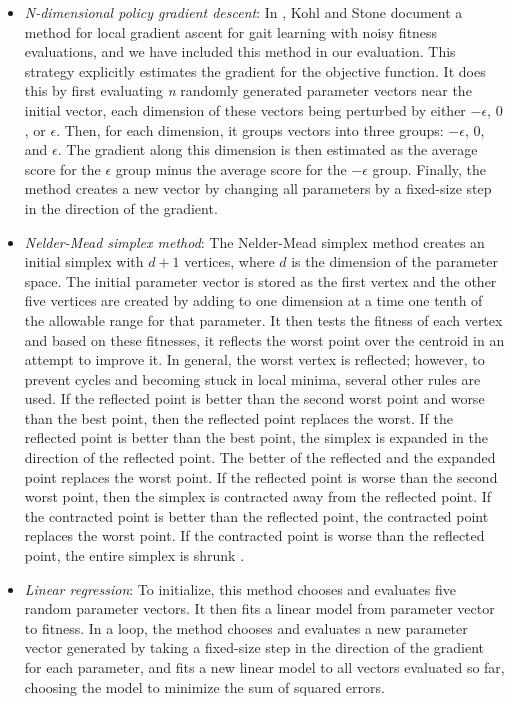\begin{itemize}
\item \emph{N-dimensional policy gradient descent}: In \cite{kohl},
  Kohl and Stone document a method for local gradient ascent for gait
  learning with noisy fitness evaluations, and we have included this
  method in our evaluation.  This strategy explicitly estimates the
  gradient for the objective function. It does this by first
  evaluating \emph{n} randomly generated parameter vectors near the
  initial vector, each dimension of these vectors being perturbed by
  either $-\epsilon$, $0$, or $\epsilon$. Then, for each dimension, it
  groups vectors into three groups: $-\epsilon$, $0$, and $\epsilon$.
  The gradient along this dimension is then estimated as the average
  score for the $\epsilon$ group minus the average score for the
  $-\epsilon$ group. Finally, the method creates a new vector by
  changing all parameters by a fixed-size step in the direction of the
  gradient.

\item \emph{Nelder-Mead simplex method}: The Nelder-Mead simplex
  method \cite{nm} creates an initial simplex with $d+1$ vertices,
  where $d$ is the dimension of the parameter space. The initial
  parameter vector is stored as the first vertex and the other five
  vertices are created by adding to one dimension at a time one tenth
  of the allowable range for that parameter. It then tests the fitness
  of each vertex and based on these fitnesses, it reflects the worst
  point over the centroid in an attempt to improve it.  In general,
  the worst vertex is reflected; however, to prevent cycles and
  becoming stuck in local minima, several other rules are used.  If
  the reflected point is better than the second worst point and worse
  than the best point, then the reflected point replaces the worst. If
  the reflected point is better than the best point, the simplex is
  expanded in the direction of the reflected point. The better of the
  reflected and the expanded point replaces the worst point. If the
  reflected point is worse than the second worst point, then the
  simplex is contracted away from the reflected point. If the
  contracted point is better than the reflected point, the contracted
  point replaces the worst point. If the contracted point is worse
  than the reflected point, the entire simplex is shrunk \cite{nm}.

\item \emph{Linear regression}: To initialize, this method chooses and
  evaluates five random parameter vectors. It then fits a linear model
  from parameter vector to fitness. In a loop, the method chooses and
  evaluates a new parameter vector generated by taking a fixed-size
  step in the direction of the gradient for each parameter, and fits a
  new linear model to all vectors evaluated so far, choosing the model
  to minimize the sum of squared errors.


\end{itemize}
